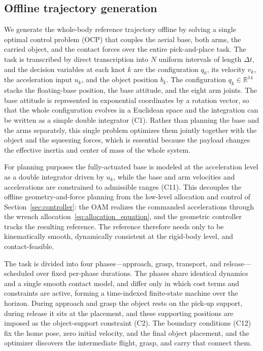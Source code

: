\documentclass[letterpaper, 10 pt, conference]{ieeeconf}  %
\begin{document}
\subsection{Offline trajectory generation}

We generate the whole-body reference trajectory offline by solving a single optimal control problem (OCP) that couples the aerial base, both arms, the carried object, and the contact forces over the entire pick-and-place task. The task is transcribed by direct transcription into $N$ uniform intervals of length $\Delta t$, and the decision variables at each knot $k$ are the configuration $q_k$, its velocity $v_k$, the acceleration input $u_k$, and the object position $b_k$. The configuration $q_k\in\mathbb{R}^{14}$ stacks the floating-base position, the base attitude, and the eight arm joints. The base attitude is represented in exponential coordinates by a rotation vector, so that the whole configuration evolves in a Euclidean space and the integration can be written as a simple double integrator (C1). Rather than planning the base and the arms separately, this single problem optimizes them jointly together with the object and the squeezing forces, which is essential because the payload changes the effective inertia and center of mass of the whole system.

For planning purposes the fully-actuated base is modeled at the acceleration level as a double integrator driven by $u_k$, while the base and arm velocities and accelerations are constrained to admissible ranges (C11). This decouples the offline geometry-and-force planning from the low-level allocation and control of Section~\ref{sec:controller}: the OAM realizes the commanded accelerations through the wrench allocation~\eqref{eq:allocation_equation}, and the geometric controller tracks the resulting reference. The reference therefore needs only to be kinematically smooth, dynamically consistent at the rigid-body level, and contact-feasible.

The task is divided into four phases---approach, grasp, transport, and release---scheduled over fixed per-phase durations. The phases share identical dynamics and a single smooth contact model, and differ only in which cost terms and constraints are active, forming a time-indexed finite-state machine over the horizon. During approach and grasp the object rests on the pick-up support, during release it sits at the placement, and these supporting positions are imposed as the object-support constraint (C2). The boundary conditions (C12) fix the home pose, zero initial velocity, and the final object placement, and the optimizer discovers the intermediate flight, grasp, and carry that connect them.
\end{document}
